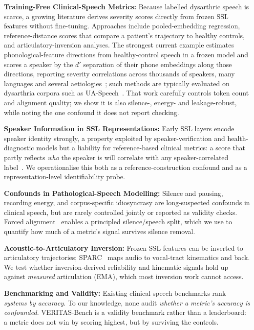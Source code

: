 \documentclass[runningheads]{llncs}
\begin{document}
\textbf{Training-Free Clinical-Speech Metrics:} Because labelled dysarthric speech
is scarce, a growing literature derives severity scores directly from frozen SSL
features without fine-tuning. Approaches include pooled-embedding regression,
reference-distance scores that compare a patient's trajectory to healthy
controls, and articulatory-inversion analyses. The strongest current example
estimates phonological-feature directions from healthy-control speech in a frozen
model and scores a speaker by the $d'$ separation of their phone embeddings along
those directions, reporting severity correlations across thousands of speakers,
many languages and several aetiologies~\cite{muller2026cross,muller2026collapse};
such methods are typically evaluated on dysarthria corpora such as
UA-Speech~\cite{kim2008uaspeech}. That work carefully controls token count and
alignment quality; we show it is also
silence-, energy- and leakage-robust, while noting the one confound it does not
report checking.

\textbf{Speaker Information in SSL Representations:} Early SSL layers encode
speaker identity strongly, a property exploited by speaker-verification and
health-diagnostic models but a liability for reference-based clinical metrics: a
score that partly reflects \emph{who} the speaker is will correlate with any
speaker-correlated label~\cite{zhu2024wavrx}. We operationalise this both as a
reference-construction confound and as a representation-level identifiability
probe.

\textbf{Confounds in Pathological-Speech Modelling:} Silence and pausing, recording
energy, and corpus-specific idiosyncrasy are long-suspected confounds in clinical
speech, but are rarely controlled jointly or reported as validity checks. Forced
alignment~\cite{mcauliffe2017mfa} enables a principled silence/speech split, which
we use to quantify how much of a metric's signal survives silence removal.

\textbf{Acoustic-to-Articulatory Inversion:} Frozen SSL features can be inverted
to articulatory trajectories; SPARC~\cite{cho2024sparc} maps audio to vocal-tract
kinematics and back. We test whether inversion-derived reliability and kinematic
signals hold up against \emph{measured} articulation (EMA), which most inversion
work cannot access.

\textbf{Benchmarking and Validity:} Existing clinical-speech benchmarks rank
\emph{systems by accuracy}. To our knowledge, none audit \emph{whether a metric's
accuracy is confounded}. VERITAS-Bench is a validity benchmark rather than a
leaderboard: a metric does not win by scoring highest, but by surviving the
controls.
\end{document}
